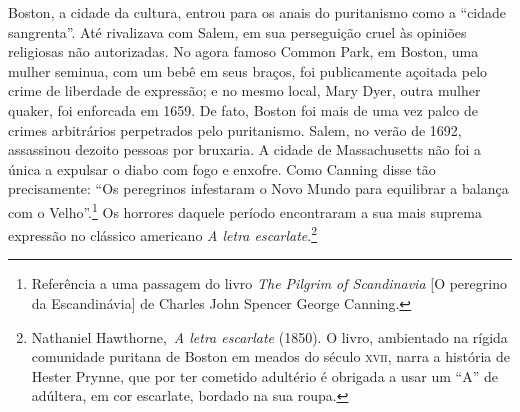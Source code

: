 Boston, a cidade da cultura, entrou para os anais do puritanismo como a
``cidade sangrenta''. Até rivalizava com Salem, em sua perseguição cruel
às opiniões religiosas não autorizadas. No agora famoso Common Park, em
Boston, uma mulher seminua, com um bebê em seus braços, foi publicamente
açoitada pelo crime de liberdade de expressão; e no mesmo local, Mary
Dyer, outra mulher quaker, foi enforcada em 1659. De fato, Boston foi
mais de uma vez palco de crimes arbitrários perpetrados pelo
puritanismo. Salem, no verão de 1692, assassinou dezoito pessoas por
bruxaria. A cidade de Massachusetts não foi a única a expulsar o diabo
com fogo e enxofre. Como Canning disse tão precisamente: ``Os peregrinos
infestaram o Novo Mundo para equilibrar a balança com o
Velho''.\footnote{Referência a uma passagem do livro \emph{The Pilgrim
  of Scandinavia} {[}O peregrino da Escandinávia{]} de Charles John
  Spencer George Canning.} Os horrores daquele período encontraram a sua
mais suprema expressão no clássico americano \emph{A letra
escarlate}.\footnote{Nathaniel Hawthorne,~\emph{A letra escarlate}
  (1850). O livro, ambientado na
  rígida comunidade puritana de Boston em meados do século \textsc{xvii}, narra a história de Hester Prynne, que por ter cometido adultério é obrigada a usar um ``A'' de adúltera,  em cor escarlate, bordado na sua roupa.}

